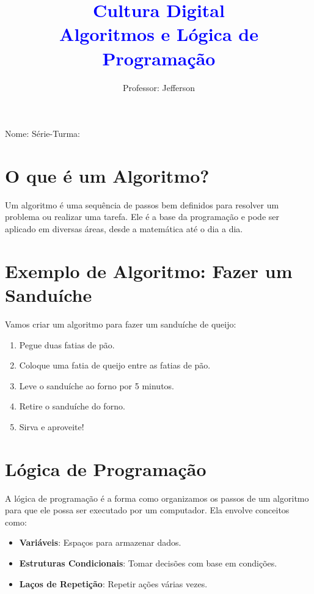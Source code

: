 \documentclass[12pt]{article}
\title{\textcolor{blue}{Cultura Digital\\ Algoritmos e Lógica de Programação}}
\author{Professor: Jefferson}
\date{}
\begin{document}
\maketitle

\begin{center}
\large{Nome: \underline{\hspace{8cm}} \quad Série-Turma: \underline{\hspace{3cm}}}
\end{center}

\begin{multicols}{2}

\section*{O que é um Algoritmo?}

Um algoritmo é uma sequência de passos bem definidos para resolver um problema ou realizar uma tarefa. Ele é a base da programação e pode ser aplicado em diversas áreas, desde a matemática até o dia a dia.

\section*{Exemplo de Algoritmo: Fazer um Sanduíche}

Vamos criar um algoritmo para fazer um sanduíche de queijo:

\begin{enumerate}
    \item Pegue duas fatias de pão.
    \item Coloque uma fatia de queijo entre as fatias de pão.
    \item Leve o sanduíche ao forno por 5 minutos.
    \item Retire o sanduíche do forno.
    \item Sirva e aproveite!
\end{enumerate}

\section*{Lógica de Programação}

A lógica de programação é a forma como organizamos os passos de um algoritmo para que ele possa ser executado por um computador. Ela envolve conceitos como:

\begin{itemize}
    \item \textbf{Variáveis}: Espaços para armazenar dados.
    \item \textbf{Estruturas Condicionais}: Tomar decisões com base em condições.
    \item \textbf{Laços de Repetição}: Repetir ações várias vezes.
\end{itemize}


\end{multicols}
\end{document}
